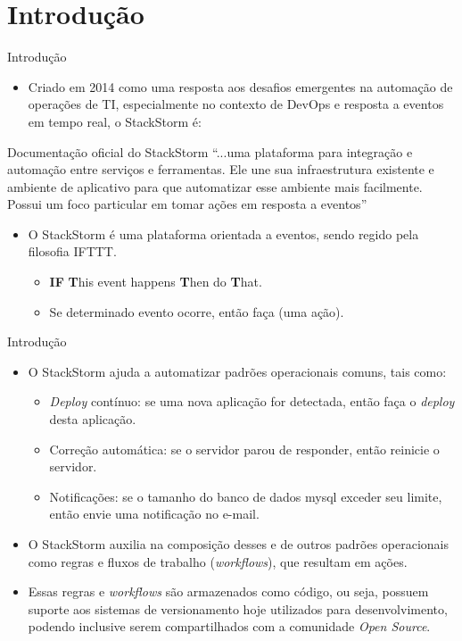 \documentclass[t,serif]{beamer}
\begin{document}
\section{Introdução}
	\begin{frame}{Introdução}
		\begin{itemize}
			\item Criado em 2014 como uma resposta aos desafios emergentes na automação de operações de TI, especialmente no contexto de DevOps e resposta a eventos em tempo real, o StackStorm é:
		\end{itemize}
		\begin{block}{Documentação oficial do StackStorm}
			``...uma plataforma para integração e automação entre serviços e ferramentas. Ele une sua infraestrutura existente e ambiente de aplicativo para que automatizar esse ambiente mais facilmente. Possui um foco particular em tomar ações em resposta a eventos''
		\end{block}
		\begin{itemize}
			\item O StackStorm é uma plataforma orientada a eventos, sendo regido pela filosofia IFTTT.
			\begin{itemize}
				\item \textbf{IF} \textbf{T}his event happens \textbf{T}hen do \textbf{T}hat.
				\item Se determinado evento ocorre, então faça (uma ação).
			\end{itemize}
		\end{itemize}
	\end{frame}
	
	\begin{frame}{Introdução}
		\begin{itemize}
			\item O StackStorm ajuda a automatizar padrões operacionais comuns, tais como:
			\begin{itemize}
				\item \textit{Deploy} contínuo: se uma nova aplicação for detectada, então faça o \textit{deploy} desta aplicação.
				\item Correção automática: se o servidor parou de responder, então reinicie o servidor.
				\item Notificações: se o tamanho do banco de dados mysql exceder seu limite, então envie uma notificação no e-mail.
			\end{itemize}
			\item O StackStorm auxilia na composição desses e de outros padrões operacionais como regras e fluxos de trabalho (\textit{workflows}), que resultam em ações.
			\item Essas regras e \textit{workflows} são armazenados como código, ou seja, possuem suporte aos sistemas de versionamento hoje utilizados para desenvolvimento, podendo inclusive serem compartilhados com a comunidade \textit{Open Source}.
		\end{itemize}
	\end{frame}
\end{document}

